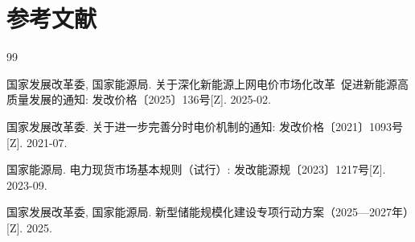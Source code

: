 %

\section*{参考文献}

\begin{thebibliography}{99}
  \setlength{\itemsep}{2pt}

  国家发展改革委, 国家能源局.
  关于深化新能源上网电价市场化改革~促进新能源高质量发展的通知:
  发改价格〔2025〕136号[Z]. 2025-02.

  国家发展改革委.
  关于进一步完善分时电价机制的通知:
  发改价格〔2021〕1093号[Z]. 2021-07.

  国家能源局.
  电力现货市场基本规则（试行）:
  发改能源规〔2023〕1217号[Z]. 2023-09.

  国家发展改革委, 国家能源局.
  新型储能规模化建设专项行动方案（2025—2027年）[Z]. 2025.


\end{thebibliography}
